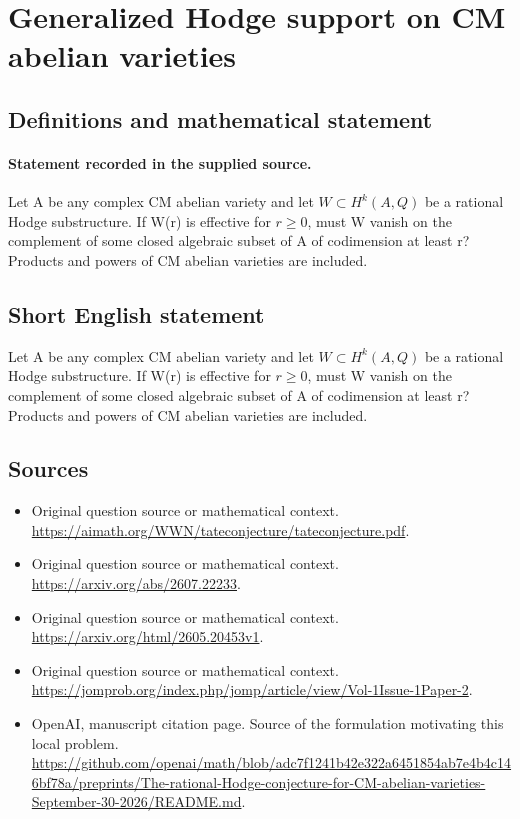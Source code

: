 \documentclass[11pt]{article}
\begin{document}
\section*{Generalized Hodge support on CM abelian varieties}\label{statement}
\subsection{Definitions and mathematical statement}
\paragraph{Statement recorded in the supplied source.}
Let A be any complex CM abelian variety and let $W\subset H^k(A,Q)$ be a rational Hodge substructure. If W(r) is effective for $r\geq 0$, must W vanish on the complement of some closed algebraic subset of A of codimension at least r? Products and powers of CM abelian varieties are included.
\subsection{Short English statement}
Let A be any complex CM abelian variety and let $W\subset H^k(A,Q)$ be a rational Hodge substructure. If W(r) is effective for $r\geq 0$, must W vanish on the complement of some closed algebraic subset of A of codimension at least r? Products and powers of CM abelian varieties are included.
\subsection{Sources}
\begin{itemize}
\item[S1] Original question source or mathematical context.
\url{https://aimath.org/WWN/tateconjecture/tateconjecture.pdf}.
\item[S2] Original question source or mathematical context.
\url{https://arxiv.org/abs/2607.22233}.
\item[S3] Original question source or mathematical context.
\url{https://arxiv.org/html/2605.20453v1}.
\item[S4] Original question source or mathematical context.
\url{https://jomprob.org/index.php/jomp/article/view/Vol-1Issue-1Paper-2}.
\item[S5] OpenAI, manuscript citation page. Source of the formulation motivating this local problem.
\url{https://github.com/openai/math/blob/adc7f1241b42e322a6451854ab7e4b4c146bf78a/preprints/The-rational-Hodge-conjecture-for-CM-abelian-varieties-September-30-2026/README.md}.
\end{itemize}
\end{document}
